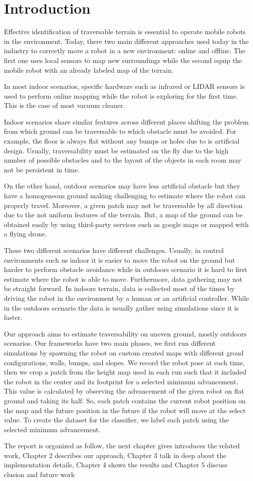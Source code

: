 \documentclass[../document.tex]{subfiles}
\begin{document}
\section{Introduction}
Effective identification of traversable terrain is essential to operate mobile robots in the environment. Today, there two main different approaches
used today in the industry to correctly move a robot in a new environment: online and offline. The first one uses local sensors to map new surroundings while the second
equip the mobile robot with an already labeled map of the terrain.

In most indoor scenarios, specific hardware such as infrared or LIDAR sensors is used to perform online mapping while the robot is exploring for the first time. This is the case of most vacuum cleaner.  

Indoor scenarios share similar features across different places shifting the problem from which ground can be traversable to which obstacle must be avoided.
For example, the floor is always flat without any bumps or holes due to is artificial design. Usually, traversability must be estimated on the fly due to the high number of possible obstacles and to the layout of the objects in each room
may not be persistent in time. 

On the other hand, outdoor scenarios may have less artificial obstacle but they have a homogeneous ground making challenging to estimate where the robot can properly travel. 
Moreover, a given patch may not be traversable by all direction due to the not uniform features of the terrain. But, a map of the ground can be obtained easily by using third-party services such as google maps or mapped with a flying drone. 

These two different scenarios have different challenges. Usually, in control environments such us indoor it is easier to move the robot on the ground but harder to perform obstacle
avoidance while in outdoors scenario it is hard to first estimate where the robot is able to move. 
Furthermore, data gathering may not be straight forward. In indoors terrain, data is collected most of the times by driving the robot in the environment by a human or an artificial
controller. While in the outdoors scenario the data is usually gather using simulations since it is faster. 

Our approach aims to estimate traversability on uneven ground, mostly outdoors scenarios. Our frameworks have two main phases, we first run different simulations by spawning the robot on custom
created maps with different groud configurations, walls, bumps, and slopes. We record the robot pose at each time, then we crop a patch from the height map used in each run such that it included the robot in the center and its footprint for a selected minimum advancement. This value is calculated by observing the advancement of the given robot on flat ground and taking its half. So, each patch contains the current robot position on the map and the future position in the future if the robot will move at the select value. To create the dataset for the classifier, we label each patch using the selected minimum advancement.

The report is organized as follow, the next chapter  gives introduces the related work, Chapter 2 describes our approach, Chapter 3 talk in deep about the implementation details,
Chapter 4 shows the results and Chapter 5 discuss clusion and future work
\end{document}
